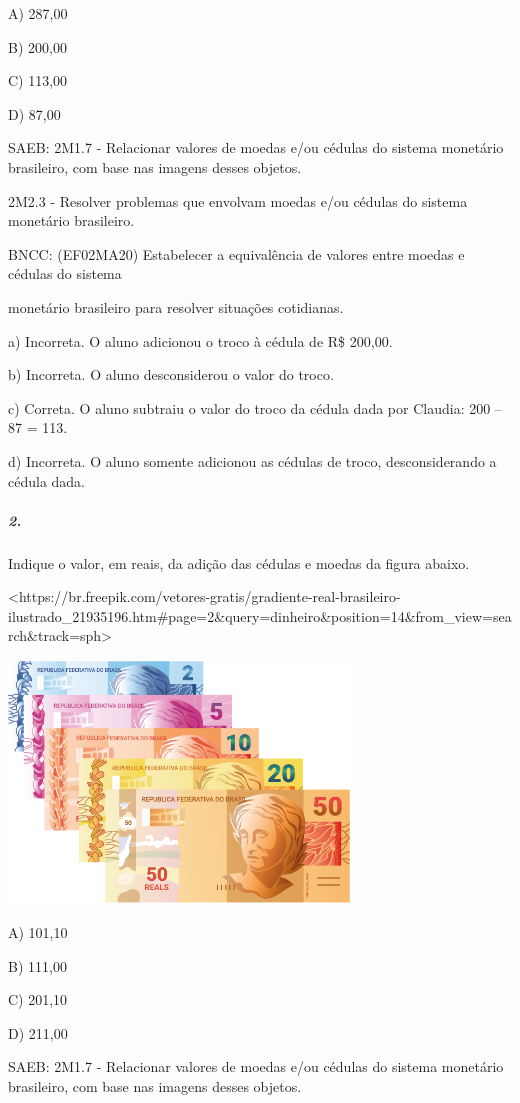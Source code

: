 A) 287,00

B) 200,00

C) 113,00

D) 87,00

SAEB: 2M1.7 - Relacionar valores de moedas e/ou cédulas do sistema
monetário brasileiro, com base nas imagens desses objetos.

2M2.3 - Resolver problemas que envolvam moedas e/ou cédulas do sistema
monetário brasileiro.

BNCC: (EF02MA20) Estabelecer a equivalência de valores entre moedas e
cédulas do sistema

monetário brasileiro para resolver situações cotidianas.

a) Incorreta. O aluno adicionou o troco à cédula de R\$ 200,00.

b) Incorreta. O aluno desconsiderou o valor do troco.

c) Correta. O aluno subtraiu o valor do troco da cédula dada por
Claudia: 200 -- 87 = 113.

d) Incorreta. O aluno somente adicionou as cédulas de troco,
desconsiderando a cédula dada.

\subparagraph{2. }\label{section-66}

Indique o valor, em reais, da adição das cédulas e moedas da figura
abaixo.

\textless{}https://br.freepik.com/vetores-gratis/gradiente-real-brasileiro-ilustrado\_21935196.htm\#page=2\&query=dinheiro\&position=14\&from\_view=search\&track=sph\textgreater{}

\includegraphics[width=3.56250in,height=2.54570in]{media/image78.png}

A) 101,10

B) 111,00

C) 201,10

D) 211,00

SAEB: 2M1.7 - Relacionar valores de moedas e/ou cédulas do sistema
monetário brasileiro, com base nas imagens desses objetos.

